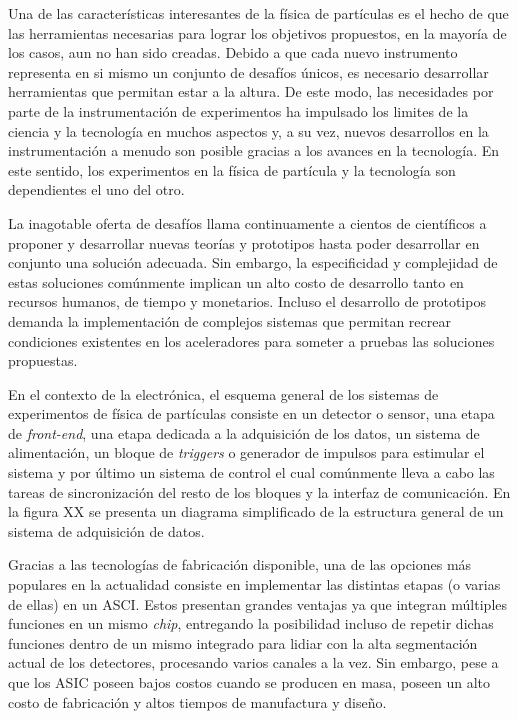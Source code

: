 Una de las características interesantes de la física de partículas es el hecho de que las herramientas necesarias para lograr los objetivos propuestos, en la mayoría de los casos, aun no han sido creadas. Debido a que cada nuevo instrumento representa en si mismo un conjunto de desafíos únicos, es necesario desarrollar herramientas que permitan estar a la altura. De este modo, las necesidades por parte de la instrumentación de experimentos ha impulsado los limites de la ciencia y la tecnología en muchos aspectos y, a su vez, nuevos desarrollos en la instrumentación a menudo son posible gracias a los avances en la tecnología.  En este sentido, los experimentos en la física de partícula y la tecnología son dependientes el uno del otro. \citep{Attila}

La inagotable oferta de desafíos llama continuamente a  cientos de científicos a proponer y desarrollar nuevas teorías y prototipos hasta poder desarrollar en conjunto una solución adecuada. Sin embargo, la especificidad y complejidad de estas soluciones comúnmente implican un alto costo de desarrollo tanto en recursos humanos, de tiempo y  monetarios. 
Incluso el desarrollo de prototipos demanda la implementación de complejos sistemas que permitan recrear condiciones existentes en los aceleradores para someter a pruebas las soluciones propuestas.

En el contexto de la electrónica, el esquema general de los sistemas de experimentos de física de partículas consiste en un detector o sensor, una etapa de \textit{front-end}, una etapa dedicada a la adquisición de los datos, un sistema de alimentación, un bloque de \textit{triggers} o generador de impulsos para estimular el sistema y por último un sistema de control el cual comúnmente lleva a cabo las tareas de sincronización del resto de los bloques y la interfaz de comunicación. En la figura XX se presenta un diagrama simplificado de la estructura general de un sistema de adquisición de datos.

	Gracias a las tecnologías de fabricación disponible, una de las opciones más populares en la actualidad consiste en implementar las distintas etapas (o varias de ellas) en un ASCI. Estos presentan grandes ventajas ya que integran múltiples funciones en un mismo \textit{chip}, entregando la posibilidad incluso de repetir dichas funciones dentro de un mismo integrado para  lidiar con la alta segmentación actual de los detectores, procesando varios canales a la vez. Sin embargo, pese a que los ASIC poseen bajos costos cuando se producen en masa, poseen un alto costo de fabricación y altos tiempos de manufactura y diseño. 
	

